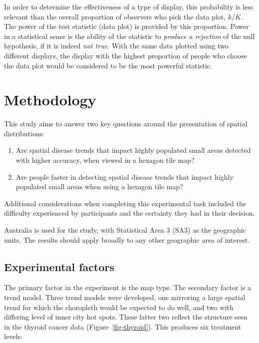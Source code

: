 \documentclass[
doublespace,
  times]{anzsauth}
\providecommand{\tightlist}{%
  \setlength{\itemsep}{0pt}\setlength{\parskip}{0pt}}
\begin{document}
In order to determine the effectiveness of a type of display, this
probability is less relevant than the overall proportion of observers
who pick the data plot, \(k/K\). The power of the test statistic (data
plot) is provided by this proportion. Power in a statistical sense is
the ability of the statistic to \emph{produce a rejection} of the null
hypothesis, if it is indeed \emph{not true}. With the same data plotted
using two different displays, the display with the highest proportion of
people who choose the data plot would be considered to be the most
powerful statistic.

\section{Methodology}\label{sec-methodology}

This study aims to answer two key questions around the presentation of
spatial distributions:

\begin{enumerate}
\def\labelenumi{\arabic{enumi}.}
\tightlist
\item
  Are spatial disease trends that impact highly populated small areas
  detected with higher accuracy, when viewed in a hexagon tile map?
\item
  Are people faster in detecting spatial disease trends that impact
  highly populated small areas when using a hexagon tile map?
\end{enumerate}

Additional considerations when completing this experimental task
included the difficulty experienced by participants and the certainty
they had in their decision.

Australia is used for the study, with Statistical Area 3 (SA3)
\citep{abs2016} as the geographic units. The results should apply
broadly to any other geographic area of interest.

\subsection{Experimental factors}\label{experimental-factors}

The primary factor in the experiment is the map type. The secondary
factor is a trend model. Three trend models were developed, one
mirroring a large spatial trend for which the choropleth would be
expected to do well, and two with differing level of inner city hot
spots. These latter two reflect the structure seen in the thyroid cancer
data (Figure~\ref{fig-thyroid}). This produces six treatment levels:
\end{document}
